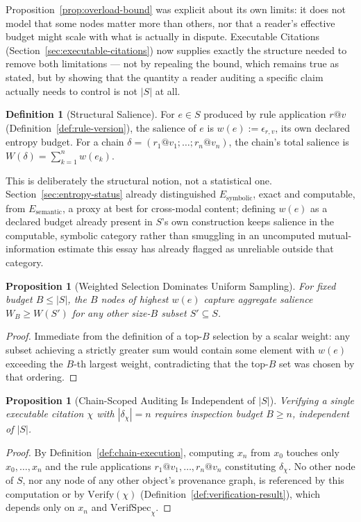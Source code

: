 \documentclass[11pt]{article}
\newtheorem{proposition}[theorem]{Proposition}
\theoremstyle{definition}
\newtheorem{definition}[theorem]{Definition}
\begin{document}
Proposition~\ref{prop:overload-bound} was explicit about its own limits: it does not model that some nodes matter more than others, nor that a reader's effective budget might scale with what is actually in dispute. Executable Citations (Section~\ref{sec:executable-citations}) now supplies exactly the structure needed to remove both limitations --- not by repealing the bound, which remains true as stated, but by showing that the quantity a reader auditing a specific claim actually needs to control is not $|S|$ at all.

\begin{definition}[Structural Salience]
\label{def:salience}
For $e \in S$ produced by rule application $r@v$ (Definition~\ref{def:rule-version}), the salience of $e$ is $w(e) := \epsilon_{r,v}$, its own declared entropy budget. For a chain $\delta = (r_1@v_1;\ldots;r_n@v_n)$, the chain's total salience is $W(\delta) = \sum_{k=1}^n w(e_k)$.
\end{definition}

This is deliberately the structural notion, not a statistical one. Section~\ref{sec:entropy-status} already distinguished $E_{\mathrm{symbolic}}$, exact and computable, from $E_{\mathrm{semantic}}$, a proxy at best for cross-modal content; defining $w(e)$ as a declared budget already present in $S$'s own construction keeps salience in the computable, symbolic category rather than smuggling in an uncomputed mutual-information estimate this essay has already flagged as unreliable outside that category.

\begin{proposition}[Weighted Selection Dominates Uniform Sampling]
\label{prop:weighted-dominates}
For fixed budget $B \leq |S|$, the $B$ nodes of highest $w(e)$ capture aggregate salience $W_B \geq W(S')$ for any other size-$B$ subset $S' \subseteq S$.
\end{proposition}
\begin{proof}
Immediate from the definition of a top-$B$ selection by a scalar weight: any subset achieving a strictly greater sum would contain some element with $w(e)$ exceeding the $B$-th largest weight, contradicting that the top-$B$ set was chosen by that ordering.
\end{proof}

\begin{proposition}[Chain-Scoped Auditing Is Independent of $|S|$]
\label{prop:chain-scoped-independent}
Verifying a single executable citation $\chi$ with $|\delta_\chi| = n$ requires inspection budget $B \geq n$, independent of $|S|$.
\end{proposition}
\begin{proof}
By Definition~\ref{def:chain-execution}, computing $x_n$ from $x_0$ touches only $x_0, \ldots, x_n$ and the rule applications $r_1@v_1, \ldots, r_n@v_n$ constituting $\delta_\chi$. No other node of $S$, nor any node of any other object's provenance graph, is referenced by this computation or by $\mathrm{Verify}(\chi)$ (Definition~\ref{def:verification-result}), which depends only on $x_n$ and $\mathrm{VerifSpec}_\chi$.
\end{proof}
\end{document}
